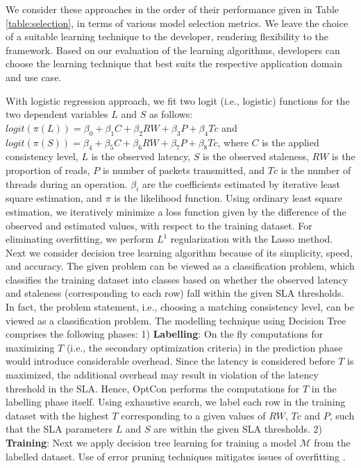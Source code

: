 \documentclass[conference]{IEEEtran}
\begin{document}
    We consider these approaches in the order of their performance given in Table \ref{table:selection}, in terms of various model selection metrics. We leave the choice of a suitable learning technique to the developer, rendering flexibility to the framework. Based on our evaluation of the learning algorithms, developers can choose the learning technique that best suits the respective application domain and use case.  \par With logistic regression approach, we fit two logit (i.e., logistic) functions for the two dependent variables  $L$ and $S$ as follows: $\mathit{logit}\left( \pi \left( L \right) \right) = \beta_0 + \beta_1 C + \beta_2 RW + \beta_3 P + \beta_4 Tc$ and $\mathit{logit}\left( \pi \left( S \right) \right) = \beta_4 + \beta_5 C + \beta_6 RW + \beta_7 P + \beta_8 Tc$, where $C$ is the applied consistency level, $L$ is the observed latency, $S$ is the observed staleness, $RW$ is the proportion of reads, $P$ is number of packets transmitted, and $Tc$ is the number of threads during an operation. $\beta_i$ are the coefficients estimated by iterative least square estimation, and $\pi$ is the likelihood function. Using ordinary least square estimation, we iteratively minimize a loss function given by the difference of the observed and estimated values, with respect to the training dataset. For eliminating overfitting, we perform $L^1$ regularization with the Lasso method.  Next we consider decision tree learning algorithm because of its simplicity, speed, and accuracy.
The given problem can be viewed as a classification problem, which classifies the training dataset into
classes based on whether the observed latency and staleness (corresponding to each row) fall within the given
SLA thresholds. In fact, the problem statement, i.e., choosing a matching consistency level, can be viewed as
a classification problem. The modelling technique using Decision Tree comprises the following phases: 1) \textbf{Labelling}: On the fly computations for maximizing $T$ (i.e., the secondary optimization criteria) in the prediction phase would introduce
considerable overhead. Since the latency is considered before $T$ is maximized, the additional overhead may result in violation of the latency threshold in the SLA. Hence, OptCon performs the computations for $T$ in the labelling phase itself.  Using exhaustive search, we label each row in the training dataset with the highest $T$ corresponding to a given values of $\mathit{RW}$, $\mathit{Tc}$ and $P$, such that the SLA parameters $L$ and $S$ are within the given SLA thresholds. 2) \textbf{Training}: Next we apply decision tree learning for training a model $\mathcal{M}$ from the labelled dataset. Use of error pruning techniques mitigates issues of overfitting \cite{Flach:2012:MLA:2490546}.
\end{document}
